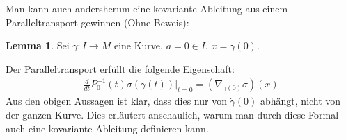 \documentclass[a4paper]{scrreprt}
\numberwithin{equation}{chapter}
\theoremstyle{definition}
\newtheorem{lemma}[defn]{Lemma}
\begin{document}
		Man kann auch andersherum eine kovariante Ableitung aus einem Paralleltransport gewinnen (Ohne Beweis):
		\begin{lemma}
			Sei $\gamma\colon I\rightarrow M$ eine Kurve, $a=0\in I$, $x=\gamma(0)$.
			
			Der Paralleltransport erfüllt die folgende Eigenschaft:
			\begin{align*}
				\frac{d}{dt} P^{-1}_0(t) \sigma(\gamma(t))\Big\vert_{t=0}=(\nabla_{\dot{\gamma}(0)}\sigma) (x)
			\end{align*}
			Aus den obigen Aussagen ist klar, dass dies nur von $\dot{\gamma}(0)$ abhängt, nicht von der ganzen Kurve. Dies erläutert anschaulich, warum man durch diese Formal auch eine kovariante Ableitung definieren kann.
		\end{lemma}
		
\end{document}
